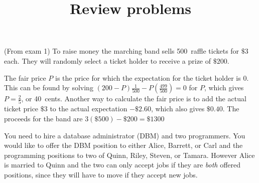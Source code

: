 \documentclass[12pt]{exam}
\author{}\date{}
\title{Review problems}
\begin{document}
\maketitle
\pagestyle{empty}
\begin{questions}

\question (From exam 1)
To raise money the marching band sells 500~raffle tickets
for $\$3$ each. They will randomly select a ticket holder to receive
a prize of $\$200$.
\begin{solution}
The fair price $P$ is the price for which the expectation
for the ticket holder is $0$. This can be found by solving
$\left(200-P\right)\frac{1}{500}-P\left(\frac{499}{500}\right)=0$
for $P$, which gives $P=\frac{2}{5}$, or 40~cents.
Another way to calculate the fair price
is to add the actual ticket price $\$3$
to the actual expectation $-\$2.60$, which also gives $\$0.40$.
The proceeds for the band are $3\left(\$500\right)-\$200=\$1300$
\end{solution}

\question You need to hire a database administrator
(DBM) and two programmers. You would like to offer the DBM
position to either Alice, Barrett, or Carl and the programming
positions to two of Quinn, Riley, Steven, or Tamara.
However Alice is married to Quinn and the two can only accept
jobs if they are {\em both} offered positions, since they will have
to move if they accept new jobs.
\end{questions}
\end{document}
